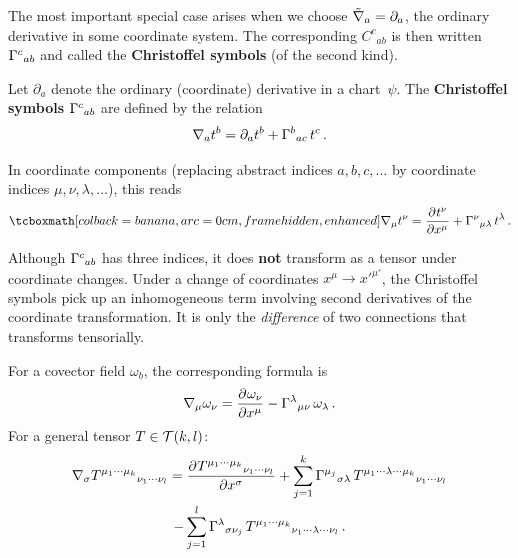 The most important special case arises when we choose
$\tilde{\nabla}_a = \partial_a$, the ordinary derivative in some
coordinate system.  The corresponding $C^c{}_{ab}$ is then
written $\Gamma^{c}{}_{ab}$ and called the \textbf{Christoffel
symbols} (of the second kind).

\begin{definition}\label{def:christoffel}
  Let $\partial_a$ denote the ordinary (coordinate) derivative
  in a chart~$\psi$.  The \textbf{Christoffel symbols}
  $\Gamma^{c}{}_{ab}$ are defined by the relation
  \begin{equation}\label{eq:christoffel-def-vector}
    \nabla_a t^b = \partial_a t^b + \Gamma^{b}{}_{ac}\, t^c\,.
  \end{equation}
\end{definition}

\noindent
In coordinate components (replacing abstract indices
$a,b,c,\dots$ by coordinate indices $\mu,\nu,\lambda,\dots$),
this reads
\begin{equation}\label{eq:covd-coord}
  \eqbox{\covd_\mu t^\nu
    = \pd{t^\nu}{x^\mu} + \chris{\nu}{\mu\lambda}\, t^\lambda}\,.
\end{equation}

\begin{remark}
  Although $\Gamma^{c}{}_{ab}$ has three indices, it does
  \textbf{not} transform as a tensor under coordinate changes.
  Under a change of coordinates $x^\mu\to x'^{\mu'}$, the
  Christoffel symbols pick up an inhomogeneous term involving
  second derivatives of the coordinate transformation.  It is
  only the \emph{difference} of two connections that transforms
  tensorially.
\end{remark}

For a covector field $\omega_b$, the corresponding formula is
\begin{equation}\label{eq:covd-covector-coord}
  \nabla_\mu\omega_\nu
    = \frac{\partial^{} \omega_\nu}{\partial {x^\mu}^{}}
      - \Gamma^{\lambda}{}_{\mu\nu}\,\omega_\lambda\,.
\end{equation}
For a general tensor $T\in\mathcal{T}(k,l)$:
\begin{multline}\label{eq:covd-general-coord}
  \nabla_\sigma T^{\mu_1\cdots\mu_k}{}_{\nu_1\cdots\nu_l}
  = \frac{\partial^{} T^{\mu_1\cdots\mu_k}{}_{\nu_1\cdots\nu_l}}{\partial {x^\sigma}^{}}
  + \sum_{j=1}^{k}
    \Gamma^{\mu_j}{}_{\sigma\lambda}\,
    T^{\mu_1\cdots\lambda\cdots\mu_k}{}_{\nu_1\cdots\nu_l} \\
  - \sum_{j=1}^{l}
    \Gamma^{\lambda}{}_{\sigma\nu_j}\,
    T^{\mu_1\cdots\mu_k}{}_{\nu_1\cdots\lambda\cdots\nu_l}\,.
\end{multline}

